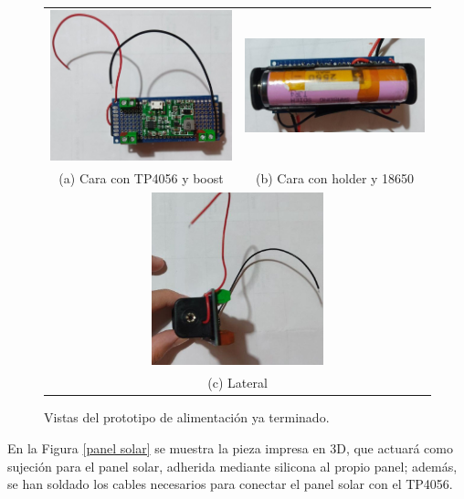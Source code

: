 \documentclass[12pt]{article}
\begin{document}
	\begin{figure}[h!]
		\begin{center}
			\begin{tabular}{cc}
				\includegraphics[width=65mm]{img/conglomerado_caraB_zoom.jpg} &   \includegraphics[width=65mm]{img/conglomerado_caraA_zoom.jpg} \\
				(a) Cara con TP4056 y boost & (b) Cara con holder y 18650  \\[6pt]
				\multicolumn{2}{c}{\includegraphics[width=50mm]{img/conglomerado_lateral_zoom.jpg} }\\
				\multicolumn{2}{c}{(c) Lateral}
			\end{tabular}
			\caption{Vistas del prototipo de alimentación ya terminado.}
			\label{prototipo alimentacion}
		\end{center}
	\end{figure}

	\pagebreak
	
	\noindent En la Figura \ref{panel solar} se muestra la pieza impresa en 3D, que actuará como sujeción para el panel solar, adherida mediante silicona al propio panel; además, se han soldado los cables necesarios para conectar el panel solar con el TP4056. \\
	
\end{document}
